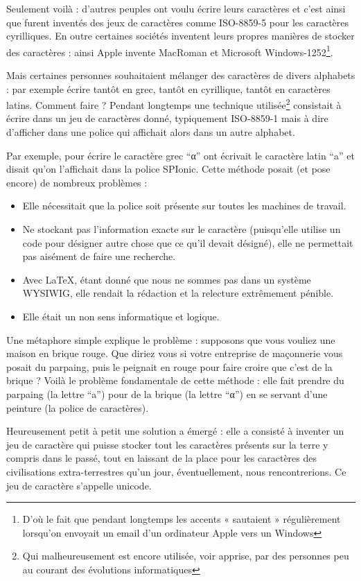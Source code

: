 Seulement voilà : d'autres peuples ont voulu écrire leurs caractères et c'est ainsi que furent inventés des jeux de caractères comme ISO-8859-5 pour les caractères cyrilliques. En outre certaines sociétés inventent leurs propres manières de stocker des caractères :  ainsi Apple invente MacRoman et Microsoft Windows-1252\footnote{D'où le fait que pendant longtemps les accents « sautaient » régulièrement lorsqu'on envoyait un email d'un ordinateur Apple vers un Windows}. 

Mais certaines personnes souhaitaient mélanger des caractères de divers alphabets : par exemple écrire tantôt en grec, tantôt en cyrillique, tantôt en caractères latins. Comment faire ? Pendant longtemps une technique utilisée\footnote{Qui malheureusement est encore utilisée, voir apprise, par des personnes peu au courant des évolutions informatiques} consistait à écrire dans un jeu de caractères donné, typiquement ISO-8859-1 mais à dire d'afficher dans une police qui affichait alors dans un autre alphabet. 

Par exemple, pour écrire le caractère grec \enquote{α} ont écrivait le caractère latin \enquote{a} et disait qu'on l'affichait dans la police SPIonic. Cette méthode posait (et pose encore) de nombreux problèmes :
\begin{itemize}
\item Elle nécessitait que la police soit présente sur toutes les machines de travail.
\item Ne stockant pas l'information exacte sur le caractère (puisqu'elle utilise un code pour désigner autre chose que ce qu'il devait désigné), elle ne permettait pas aisément de faire une recherche.
\item Avec \LaTeX, étant donné que nous ne sommes pas dans un système WYSIWIG, elle rendait la rédaction et la relecture extrêmement pénible.
\item Elle était un non sens informatique et logique. 
\end{itemize}

Une métaphore simple explique le problème : supposons que vous vouliez une maison en brique rouge. Que diriez vous si votre entreprise de maçonnerie vous posait du parpaing, puis le peignait en rouge pour faire croire que c'est de la brique ? Voilà le problème fondamentale de cette méthode : elle fait prendre du parpaing (la lettre \enquote{a}) pour de la brique (la lettre \enquote{α}) en se servant d'une peinture (la police de caractères).

Heureusement petit à petit une solution a émergé : elle a consisté à inventer un jeu de caractère qui puisse stocker tout les caractères présents sur la terre y compris dans le passé, tout en laissant de la place pour les caractères des civilisations extra-terrestres qu'un jour, éventuellement, nous rencontrerions. Ce jeu de caractère s'appelle unicode.

